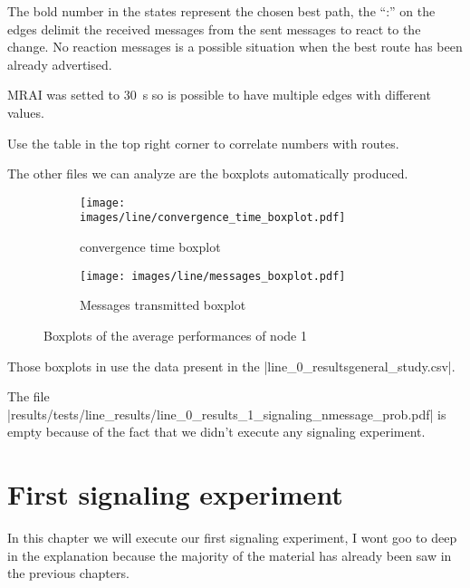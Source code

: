 \documentclass[10pt,journal,onecolumn]{IEEEtran}
\newcommand{\q}[1]{``#1''}
\begin{document}
The bold number in the states represent the chosen best path, the \q{:} on the
edges delimit the received messages from the sent messages to react to the change.
No reaction messages is a possible situation when the best route has been already
advertised.

MRAI was setted to \SI{30}{\second} so is possible to have multiple edges
with different values.

Use the table in the top right corner to correlate numbers with routes.

The other files we can analyze are the boxplots automatically produced.

\begin{figure}[H]
     \centering
     \begin{subfigure}[b]{0.48\textwidth}
         \centering
         \texttt{[image: images/line/convergence\_time\_boxplot.pdf]}
         \caption{convergence time boxplot}
         \label{fig:line_time_boxplot}
     \end{subfigure}
     \hfill
     \begin{subfigure}[b]{0.48\textwidth}
         \centering
         \texttt{[image: images/line/messages\_boxplot.pdf]}
         \caption{Messages transmitted boxplot}
         \label{fig:line_messages_boxplot}
     \end{subfigure}
	 \caption{Boxplots of the average performances of node \num{1}}
     \label{fig:line_boxplot}
\end{figure}

Those boxplots in  use the data present in the |line_0_resultsgeneral_study.csv|.

The file |results/tests/line_results/line_0_results_1_signaling_nmessage_prob.pdf|
is empty because of the fact that we didn't execute any signaling experiment.

\section{First signaling experiment}
\label{sec:signaling_experiment}

In this chapter we will execute our first signaling experiment, I wont goo to 
deep in the explanation because the majority of the material has already been
saw in the previous chapters.
\end{document}
